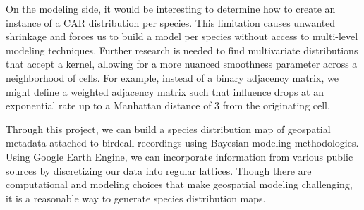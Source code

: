 \documentclass[notitlepage]{article}
\begin{document}
On the modeling side, it would be interesting to determine how to create an instance of a CAR distribution per species.
This limitation causes unwanted shrinkage and forces us to build a model per species without access to multi-level modeling techniques.
Further research is needed to find multivariate distributions that accept a kernel, allowing for a more nuanced smoothness parameter across a neighborhood of cells.
For example, instead of a binary adjacency matrix, we might define a weighted adjacency matrix such that influence drops at an exponential rate up to a Manhattan distance of 3 from the originating cell.

Through this project, we can build a species distribution map of geospatial metadata attached to birdcall recordings using Bayesian modeling methodologies.
Using Google Earth Engine, we can incorporate information from various public sources by discretizing our data into regular lattices.
Though there are computational and modeling choices that make geospatial modeling challenging, it is a reasonable way to generate species distribution maps.

\printbibliography
\end{document}
